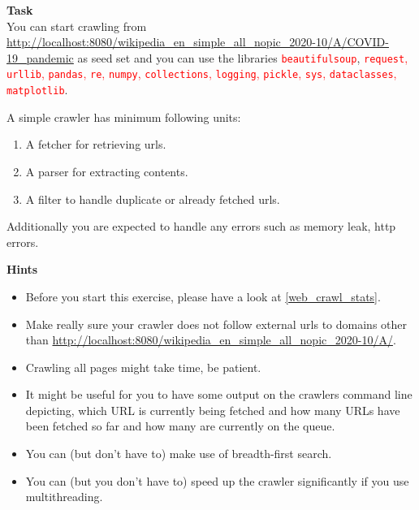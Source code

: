 \documentclass{resources/WeSTassignment}
\begin{document}
\textbf{Task} \\
You can start crawling from \url{http://localhost:8080/wikipedia_en_simple_all_nopic_2020-10/A/COVID-19_pandemic} as seed set and you can use the libraries \textcolor{red}{\texttt{beautifulsoup}}, \textcolor{red}{\texttt{request}, \texttt{urllib}, \texttt{pandas}, \texttt{re}, \texttt{numpy}, \texttt{collections}, \texttt{logging}, \texttt{pickle}, \texttt{sys}, \texttt{dataclasses}, \texttt{matplotlib}}.

A simple crawler has minimum following units:\\
\begin{enumerate}
    \item A fetcher for retrieving urls.
    \item A parser for extracting contents.
    \item A filter to handle duplicate or already fetched urls.
\end{enumerate}
Additionally you are expected to handle any errors such as memory leak, http errors. 

\textbf{Hints} \\

\begin{itemize}
    \item Before you start this exercise, please have a look at \ref{web_crawl_stats}. 
    \item Make really sure your crawler does not follow external urls to domains other than \url{http://localhost:8080/wikipedia_en_simple_all_nopic_2020-10/A/}.
    \item Crawling all pages might take time, be patient.
    \item It might be useful for you to have some output on the crawlers command line depicting, which URL is currently being fetched and how many URLs have been fetched so far and how many are currently on the queue.
    \item  You can (but don’t have to) make use of breadth-first search.
    \item You can (but you don’t have to) speed up the crawler significantly if you use multithreading.
\end{itemize}
\end{document}
